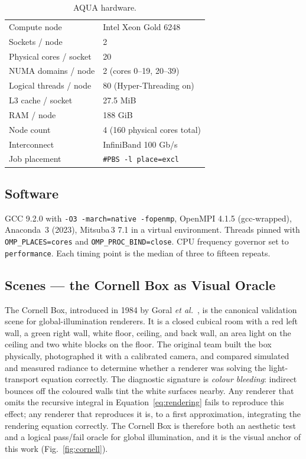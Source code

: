 \documentclass[twocolumn,10pt,cleanhead,cleanfoot]{asme2e}
\begin{document}
\begin{table}[t]
\caption{AQUA hardware.}
\label{tab:hw}
\begin{center}\small
\begin{tabular}{ll}
\toprule
Compute node & Intel Xeon Gold 6248 \\
Sockets / node & 2 \\
Physical cores / socket & 20 \\
NUMA domains / node & 2 (cores 0--19, 20--39) \\
Logical threads / node & 80 (Hyper-Threading on) \\
L3 cache / socket & 27.5 MiB \\
RAM / node & 188 GiB \\
Node count & 4 (160 physical cores total) \\
Interconnect & InfiniBand 100 Gb/s \\
Job placement & \texttt{\#PBS -l place=excl} \\
\bottomrule
\end{tabular}
\end{center}
\end{table}

\subsection*{Software}
GCC 9.2.0 with \texttt{-O3 -march=native -fopenmp}, OpenMPI 4.1.5 (gcc-wrapped), Anaconda~3 (2023), Mitsuba\,3 7.1 in a virtual environment. Threads pinned with \texttt{OMP\_PLACES=cores} and \texttt{OMP\_PROC\_BIND=close}. CPU frequency governor set to \texttt{performance}. Each timing point is the median of three to fifteen repeats.

\subsection*{Scenes — the Cornell Box as Visual Oracle}
The Cornell Box, introduced in 1984 by Goral \emph{et al.}~\cite{goral1984cornell}, is the canonical validation scene for global-illumination renderers. It is a closed cubical room with a red left wall, a green right wall, white floor, ceiling, and back wall, an area light on the ceiling and two white blocks on the floor. The original team built the box physically, photographed it with a calibrated camera, and compared simulated and measured radiance to determine whether a renderer was solving the light-transport equation correctly. The diagnostic signature is \emph{colour bleeding}: indirect bounces off the coloured walls tint the white surfaces nearby. Any renderer that omits the recursive integral in Equation~\eqref{eq:rendering} fails to reproduce this effect; any renderer that reproduces it is, to a first approximation, integrating the rendering equation correctly. The Cornell Box is therefore both an aesthetic test and a logical pass/fail oracle for global illumination, and it is the visual anchor of this work (Fig.~\ref{fig:cornell}).
\end{document}
